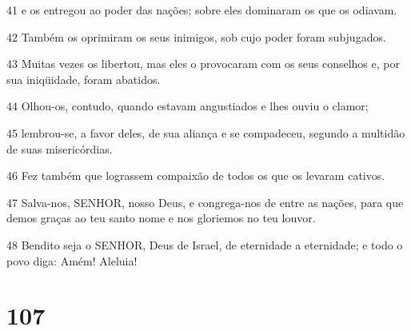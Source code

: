 \par 41 e os entregou ao poder das nações; sobre eles dominaram os que os odiavam.
\par 42 Também os oprimiram os seus inimigos, sob cujo poder foram subjugados.
\par 43 Muitas vezes os libertou, mas eles o provocaram com os seus conselhos e, por sua iniqüidade, foram abatidos.
\par 44 Olhou-os, contudo, quando estavam angustiados e lhes ouviu o clamor;
\par 45 lembrou-se, a favor deles, de sua aliança e se compadeceu, segundo a multidão de suas misericórdias.
\par 46 Fez também que lograssem compaixão de todos os que os levaram cativos.
\par 47 Salva-nos, SENHOR, nosso Deus, e congrega-nos de entre as nações, para que demos graças ao teu santo nome e nos gloriemos no teu louvor.
\par 48 Bendito seja o SENHOR, Deus de Israel, de eternidade a eternidade; e todo o povo diga: Amém! Aleluia!

\chapter{107}

